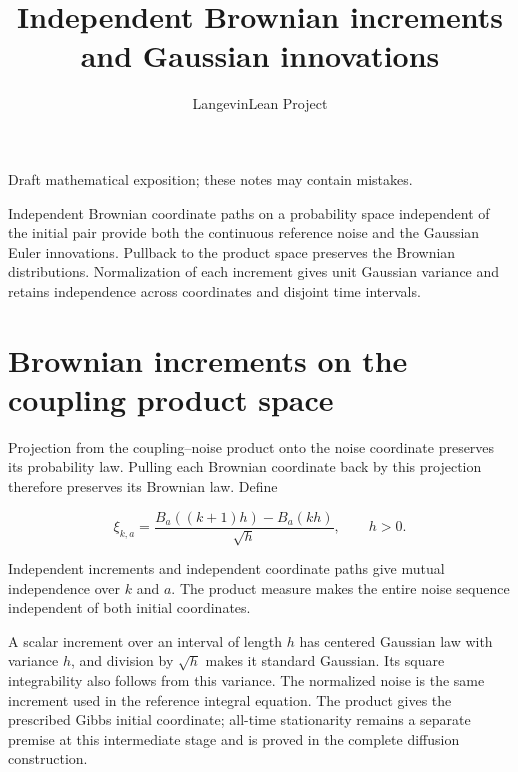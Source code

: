 \documentclass[11pt,a4paper]{article}
\title{\texorpdfstring{Independent Brownian increments and Gaussian innovations}{Independent Brownian increments and Gaussian innovations}}
\author{LangevinLean Project}
\date{}
\begin{document}
\maketitle
Draft mathematical exposition; these notes may contain mistakes.


Independent Brownian coordinate paths on a probability space independent of the initial pair provide both the continuous reference noise and the Gaussian Euler innovations. Pullback to the product space preserves the Brownian distributions. Normalization of each increment gives unit Gaussian variance and retains independence across coordinates and disjoint time intervals.



\section{\texorpdfstring{Brownian increments on the coupling product space}{Brownian increments on the coupling product space}}


Projection from the coupling–noise product onto the noise coordinate preserves its probability law. Pulling each Brownian coordinate back by this projection therefore preserves its Brownian law. Define

\[\xi_{k,a}=\frac{B_a((k+1)h)-B_a(kh)}{\sqrt h},\qquad h>0.\]

Independent increments and independent coordinate paths give mutual independence over \(k\) and \(a\). The product measure makes the entire noise sequence independent of both initial coordinates.



A scalar increment over an interval of length \(h\) has centered Gaussian law with variance \(h\), and division by \(\sqrt h\) makes it standard Gaussian. Its square integrability also follows from this variance. The normalized noise is the same increment used in the reference integral equation. The product gives the prescribed Gibbs initial coordinate; all-time stationarity remains a separate premise at this intermediate stage and is proved in the complete diffusion construction.
\end{document}
